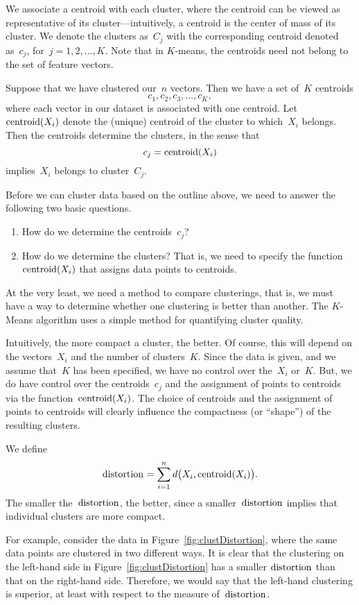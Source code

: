 \documentclass[12pt]{article}
\begin{document}
We associate a centroid
with each cluster, where the centroid can be viewed as representative 
of its cluster---intuitively, a centroid is the center of mass of its cluster.
We denote the clusters as~$C_j$ with the 
corresponding centroid denoted as~$c_j$, for~$j=1,2,\ldots,K$.
Note that in $K$-means, the centroids need not belong to the set
of feature vectors.

Suppose that we have clustered our~$n$ vectors. 
Then we have a set of~$K$ centroids
$$
  c_1, c_2, c_3, \ldots, c_K , 
$$
where each vector in our dataset is associated with one centroid.
Let~$\mbox{centroid}(X_i)$ denote the (unique) centroid of the cluster
to which~$X_i$ belongs. 
Then the centroids determine the clusters, in the sense that 
$$
  c_j = \mbox{centroid}(X_i) 
$$
implies~$X_i$ belongs to cluster~$C_j$. 

Before we can cluster data based on the outline above, 
we need to answer the following two basic questions.
\begin{enumerate}
\item How do we determine the centroids~$c_j$?
\item How do we determine the clusters? That is,
we need to specify the function~$\mbox{centroid}(X_i)$
that assigns data points to centroids.
\end{enumerate}
At the very least, we need a method to compare clusterings, that is,
we must have a way to determine whether one clustering is better than another.
The $K$-Means algorithm uses a simple method for
quantifying cluster quality. 

Intuitively, the more compact a cluster, the better. Of course, this will
depend on the vectors~$X_i$ and the number of clusters~$K$. Since the data is given,
and we assume that~$K$ has been specified, 
we have no control over the~$X_i$ or~$K$.  But, we do have
control over the centroids~$c_j$ and the assignment of points to centroids via the
function~$\mbox{centroid}(X_i)$. The choice of centroids and the assignment of
points to centroids will clearly influence the compactness
(or ``shape'') of the resulting clusters. 

We define
\begin{equation}\label{eq:cluster_distortion}
  \mbox{distortion}_{} = \sum_{i=1}^n d\bigl(X_i,\mbox{centroid}(X_i)\bigr) .
\end{equation}
The smaller the~$\mbox{distortion}_{}$, the better, since a smaller~$\mbox{distortion}_{}$
implies that individual clusters are more compact.

For example, consider the data in Figure~\ref{fig:clustDistortion}, where the same
data points are clustered in two different ways. It is clear that the clustering on 
the left-hand side in Figure~\ref{fig:clustDistortion} has a smaller $\mbox{distortion}_{}$ than 
that on the right-hand side. Therefore, we would say that the left-hand clustering is superior,
at least with respect to the measure of~$\mbox{distortion}_{}$.
\end{document}
